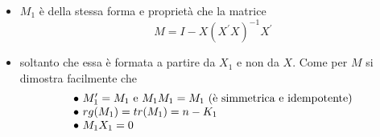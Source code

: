 \documentclass[a4paper]{report}
\theoremstyle{remark}
\begin{document}
\begin{itemize}
\item $M_{1}$ \`{e} della stessa forma e propriet\`{a} che la matrice%
\begin{equation*}
M=I-X\left( X^{\prime }X\right) ^{-1}X^{\prime }
\end{equation*}

\item soltanto che essa \`{e} formata a partire da $X_{1}$ e non da $X$.
Come per $M$ si dimostra facilmente che%
\begin{equation*}
\begin{tabular}{l}
$\bullet \ M_{1}^{\prime }=M_{1}$ e $M_{1}M_{1}=M_{1}\text{ (\`{e}
simmetrica e idempotente)}$ \\ 
$\bullet \ rg(M_{1})=tr(M_{1})=n-K_{1}$ \\ 
$\bullet \ M_{1}X_{1}=0$%
\end{tabular}%
\end{equation*}
\end{itemize}
\end{document}
